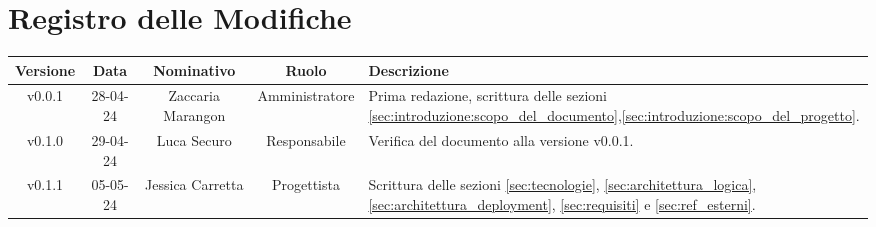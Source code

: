 \section*{\Large Registro delle Modifiche}
    \begin{table}[h]
        \centering
        \renewcommand\tabularxcolumn[1]{m{#1}} %
        \renewcommand{\arraystretch}{1.5}
        \begin{tabularx}{0.98\textwidth}
            {c|c|c|c|>{\centering\arraybackslash}X}
            \rowcolor{black}
            \textbf{\color{white} Versione} & \textbf{\color{white} Data} & \textbf{\color{white} Nominativo} & \textbf{\color{white} Ruolo} & \textbf{\color{white} Descrizione} \\ 
            \hline

            v0.0.1 & 28-04-24 & Zaccaria Marangon & Amministratore & Prima redazione, scrittura delle sezioni \ref{sec:introduzione:scopo_del_documento},\ref{sec:introduzione:scopo_del_progetto}. \\
            v0.1.0 & 29-04-24 & Luca Securo & Responsabile & Verifica del documento alla versione v0.0.1. \\
            v0.1.1 & 05-05-24 & Jessica Carretta & Progettista & Scrittura delle sezioni \ref{sec:tecnologie}, \ref{sec:architettura_logica}, \ref{sec:architettura_deployment}, \ref{sec:requisiti} e \ref{sec:ref_esterni}.\\
            \hline
        \end{tabularx}
    \end{table}